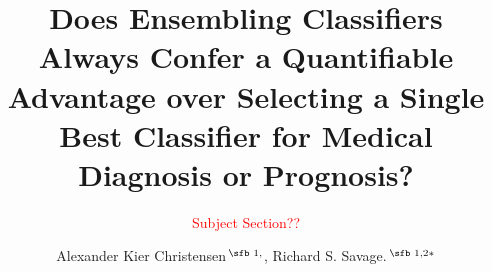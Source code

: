 \documentclass{bioinfo}
\begin{document}

\subtitle{\textcolor{red}{Subject Section??}}

\title[Is Ensembling Always Preferable for Medical Data?]{Does Ensembling Classifiers Always Confer a Quantifiable Advantage over Selecting a Single Best Classifier for Medical Diagnosis or Prognosis?}

\author[Christensen, A. K. \textit{et~al}.]{Alexander Kier Christensen\,$^{\text{\sfb 1,}}$, Richard S. Savage.\,$^{\text{\sfb 1,2}*}$}

\address{$^{\text{\sf 1}}$Systems Biology Centre, University of Warwick, Coventry, CV4 7AL, UK.
\newline
$^{\text{\sf 2}}$Warwick Medical School, University of Warwick, Coventry, CV4 7AL, UK.}



\end{document}
